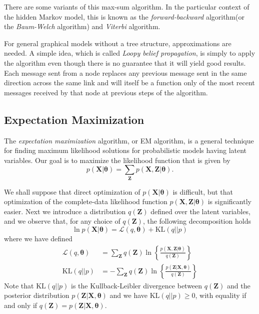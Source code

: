 \documentclass[a4paper]{book}
\newcommand{\up}{\mathrm}
\renewcommand{\bf}{\mathbf}
\renewcommand{\cal}{\mathcal}
\newcommand{\imp}[1]{\textit{#1}}
\newcommand{\bs}{\boldsymbol}
\begin{document}
There are some variants of this max-sum algorithm. In the particular context of the hidden Markov model, this is known as the \imp{forward-backward} algorithm(or the \imp{Baum-Welch} algorithm) and \imp{Viterbi} algorithm.

For general graphical models without a tree structure, approximations are needed. A simple idea, which is called \imp{Loopy belief propagation}, is simply to apply the algorithm even though there is no guarantee that it will yield good results. Each message sent from a node replaces any previous message sent in the same direction across the same link and will itself be a function only of the most recent messages received by that node at previous steps of the algorithm.
\subsection{Expectation Maximization}
The \imp{expectation maximization} algorithm, or EM algorithm, is a general technique for finding maximum likelihood solutions for probabilistic models having latent variables. Our goal is to maximize the likelihood function that is given by
\begin{equation}
	p(\bf{X}|\bs{\theta}) = \sum_{\bf{Z}} p(\bf{X,Z}|\bs{\theta}). 
\end{equation}

We shall suppose that direct optimization of $p(\bf{X}|\bs{\theta})$ is difficult, but that optimization of the complete-data likelihood function $p(\bf{X,Z}|\bs{\theta})$ is significantly easier. Next we introduce a distribution $q(\bf{Z})$ defined over the latent variables, and we observe that, for any choice of $q(\bf{Z})$, the following decomposition holds
\begin{equation}
	\ln p(\bf{X}|\bs{\theta}) = \cal{L}(q,\bs{\theta})+\up{KL}(q||p) \label{EMde}
\end{equation}
where we have defined
\begin{align}
	\cal{L}(q,\bs{\theta})&= \sum_{\bf{Z}} q(\bf{Z}) \ln \left\{ \frac{p(\bf{X,Z}|\bs{\theta})}{q(\bf{Z})} \right\}\\
	\up{KL}(q||p) &= -\sum_{\bf{Z}} q(\bf{Z}) \ln \left\{ \frac{p(\bf{Z}|\bf{X},\bs{\theta})}{q(\bf{Z})}\right\}
\end{align}
Note that $\up{KL}(q||p)$ is the Kullback-Leibler divergence between $q(\bf{Z})$ and the posterior distribution $p(\bf{Z|X},\bs{\theta})$ and we have $\up{KL}(q||p) \geq 0$, with equality if and only if $q(\bf{Z} ) = p(\bf{Z|X},\bf{\theta})$.
\end{document}
